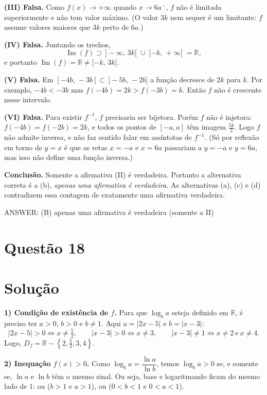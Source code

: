 \documentclass{article}%
\begin{document}
\textbf{(III) Falsa.} Como $f(x)\to+\infty$ quando $x\to 6a^{-}$, $f$ não é limitada superiormente e não tem valor máximo. (O valor $3k$ nem sequer é um limitante: $f$ assume valores maiores que $3k$ perto de $6a$.)

\textbf{(IV) Falsa.} Juntando os trechos,
\[
\operatorname{Im}(f)\supset\,]-\infty,\,3k[\;\cup\;[-k,\,+\infty[\;=\mathbb{R},
\]
e portanto $\operatorname{Im}(f)=\mathbb{R}\neq[-k,\,3k[$.

\textbf{(V) Falsa.} Em $[-4b,\,-3b]\subset\,]-5b,\,-2b]$ a função decresce de $2k$ para $k$. Por exemplo, $-4b<-3b$ mas $f(-4b)=2k>f(-3b)=k$. Então $f$ não é crescente nesse intervalo.

\textbf{(VI) Falsa.} Para existir $f^{-1}$, $f$ precisaria ser bijetora. Porém $f$ não é injetora: $f(-4b)=f(-2b)=2k$, e todos os pontos de $[-a,a]$ têm imagem $\tfrac{5k}{2}$. Logo $f$ não admite inversa, e não faz sentido falar em assíntotas de $f^{-1}$. (Só por reflexão em torno de $y=x$ é que as retas $x=-a$ e $x=6a$ passariam a $y=-a$ e $y=6a$, mas isso não define uma função inversa.)

\textbf{Conclusão.} Somente a afirmativa (II) é verdadeira. Portanto a alternativa correta é a (b), \emph{apenas uma afirmativa é verdadeira}. As alternativas (a), (c) e (d) contradizem essa contagem de exatamente uma afirmativa verdadeira.

ANSWER: (B) apenas uma afirmativa é verdadeira (somente a II)%
\newpage%
\section*{Questão 18}

\section*{Solução}

\textbf{1) Condição de existência de $f$.} Para que $\log_b a$ esteja definido em $\mathbb{R}$, é preciso ter $a>0$, $b>0$ e $b\neq 1$. Aqui $a=|2x-5|$ e $b=|x-3|$:
\[
|2x-5|>0 \iff x\neq \tfrac{5}{2}, \qquad |x-3|>0 \iff x\neq 3, \qquad |x-3|\neq 1 \iff x\neq 2 \ \text{e}\ x\neq 4 .
\]
Logo, $D_f=\mathbb{R}-\left\{2,\tfrac{5}{2},3,4\right\}$.

\textbf{2) Inequação $f(x)>0$.} Como $\log_b a=\dfrac{\ln a}{\ln b}$, temos $\log_b a>0$ se, e somente se, $\ln a$ e $\ln b$ têm o mesmo sinal. Ou seja, base e logaritmando ficam do mesmo lado de $1$: ou ($b>1$ e $a>1$), ou ($0<b<1$ e $0<a<1$).
\end{document}
